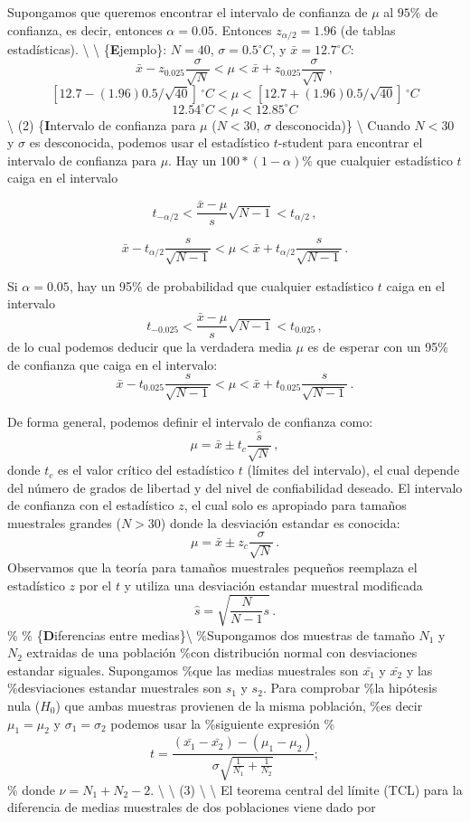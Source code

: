 \documentclass[
]{agujournal2019}
\begin{document}
Supongamos que queremos encontrar el intervalo de confianza de \(\mu\)
al \(95\%\) de confianza, es decir, entonces \(\alpha=0.05\). Entonces
\(z_{\alpha/2}=1.96\) (de tablas estadísticas). \textbackslash{}
\textbackslash{} \{\textbf Ejemplo\}: \(N=40\), \(\sigma=0.5^\circ{C}\),
y \(\bar{x}=12.7^\circ{C}\):
\[\bar{x}-z_{0.025}\frac{\sigma}{\sqrt{N}}<\mu<\bar{x}+z_{0.025}\frac{\sigma}{\sqrt{N}}\,,\]
\[\left[12.7-(1.96)0.5/\sqrt{40}\right]\,^\circ{C}<\mu<\left[12.7+(1.96)0.5/\sqrt{40}\right]\,^\circ{C}\]
\[12.54^\circ{C} < \mu < 12.85^\circ{C}\] \textbackslash{} \noindent (2)
\{\textbf Intervalo de confianza para \(\mu\) (\(N<30\), \(\sigma\)
desconocida)\} \textbackslash{} Cuando \(N<30\) y \(\sigma\) es
desconocida, podemos usar el estadístico \(t\)-student para encontrar el
intervalo de confianza para \(\mu\). Hay un \(100*(1-\alpha)\%\) que
cualquier estadístico \(t\) caiga en el intervalo

\[t_{-\alpha/2}<\frac{\bar{x}-\mu}{s}\sqrt{N-1}<t_{\alpha/2}\,,\]

\[\bar{x}-t_{\alpha/2}\frac{s}{\sqrt{N-1}} < \mu <
   \bar{x}+t_{\alpha/2}\frac{s}{\sqrt{N-1}}\,.\]

Si \(\alpha=0.05\), hay un 95\% de probabilidad que cualquier
estadístico \(t\) caiga en el intervalo
\[t_{-0.025}<\frac{\bar{x}-\mu}{s}\sqrt{N-1}<t_{0.025}\,,\] de lo cual
podemos deducir que la verdadera media \(\mu\) es de esperar con un 95\%
de confianza que caiga en el intervalo:
\[\bar{x}-t_{0.025}\frac{s}{\sqrt{N-1}}<\mu<\bar{x}+t_{0.025}\frac{s}{\sqrt{N-1}}\,.\]

De forma general, podemos definir el intervalo de confianza como:
\[\mu=\bar{x}\pm t_c\frac{\hat{s}}{\sqrt{N}}\,,\] donde \(t_c\) es el
valor crítico del estadístico \(t\) (límites del intervalo), el cual
depende del número de grados de libertad y del nivel de confiabilidad
deseado. El intervalo de confianza con el estadístico \(z\), el cual
solo es apropiado para tamaños muestrales grandes (\(N>30\)) donde la
desviación estandar es conocida:
\[\mu=\bar{x}\pm z_c\frac{\sigma}{\sqrt{N}}\,.\] Observamos que la
teoría para tamaños muestrales pequeños reemplaza el estadístico \(z\)
por el \(t\) y utiliza una desviación estandar muestral modificada
\[\hat{s}=\sqrt{\frac{N}{N-1}s}\,.\] \%\vspace{0.5cm} \%
\{\noindent \textbf Diferencias entre medias\}\textbackslash{}
\%Supongamos dos muestras de tamaño \(N_1\) y \(N_2\) extraidas de una
población \%con distribución normal con desviaciones estandar siguales.
Supongamos \%que las medias muestrales son \(\bar{x_1}\) y \(\bar{x_2}\)
y las \%desviaciones estandar muestrales son \(s_1\) y \(s_2\). Para
comprobar \%la hipótesis nula (\(H_0\)) que ambas muestras provienen de
la misma población, \%es decir \(\mu_1=\mu_2\) y \(\sigma_1=\sigma_2\)
podemos usar la \%siguiente expresión
\%\[t=\frac{(\bar{x_1}-\bar{x_2})-(\mu_1-\mu_2)}{\sigma\sqrt{\frac{1}{N_1} + \frac{1}{N_2}}};
\] \% donde \(\nu=N_1+N_2-2\). \textbackslash{} \textbackslash{} (3)
\textbackslash{} \textbackslash{} El teorema central del límite (TCL)
para la diferencia de medias muestrales de dos poblaciones viene dado
por
\end{document}
